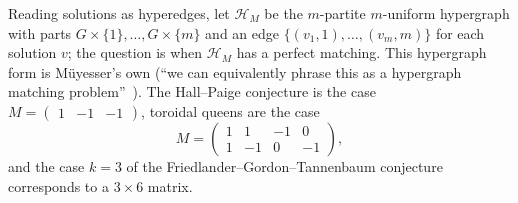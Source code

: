 Reading solutions as hyperedges, let $\mathcal H_M$ be the $m$-partite $m$-uniform hypergraph with parts $G\times\{1\},\dots,G\times\{m\}$ and an edge $\{(v_1,1),\dots,(v_m,m)\}$ for each solution $v$; the question is when $\mathcal H_M$ has a perfect matching. This hypergraph form is M\"uyesser's own (``we can equivalently phrase this as a hypergraph matching problem''~\cite[\S7.3]{muy23}). The Hall--Paige conjecture is the case $M=\begin{pmatrix}1&-1&-1\end{pmatrix}$, toroidal queens are the case
\[
M=\begin{pmatrix}1&1&-1&0\\1&-1&0&-1\end{pmatrix},
\]
and the case $k=3$ of the Friedlander--Gordon--Tannenbaum conjecture corresponds to a $3\times6$ matrix.
